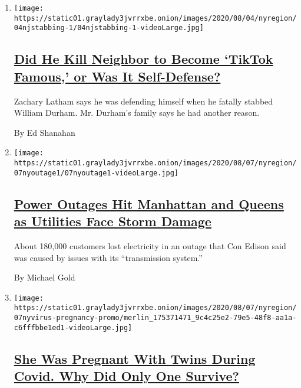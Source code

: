 \begin{enumerate}
\def\labelenumi{\arabic{enumi}.}
\item
  \texttt{[image: https://static01.graylady3jvrrxbe.onion/images/2020/08/04/nyregion/04njstabbing-1/04njstabbing-1-videoLarge.jpg]}

  \hypertarget{did-he-kill-neighbor-to-become-tiktok-famous-or-was-it-self-defense}{%
  \subsection{\texorpdfstring{\href{/2020/08/07/nyregion/tiktok-manslaughter-new-jersey.html}{Did
  He Kill Neighbor to Become `TikTok Famous,' or Was It
  Self-Defense?}}{Did He Kill Neighbor to Become `TikTok Famous,' or Was It Self-Defense?}}\label{did-he-kill-neighbor-to-become-tiktok-famous-or-was-it-self-defense}}

  Zachary Latham says he was defending himself when he fatally stabbed
  William Durham. Mr. Durham's family says he had another reason.

  By Ed Shanahan
\item
  \texttt{[image: https://static01.graylady3jvrrxbe.onion/images/2020/08/07/nyregion/07nyoutage1/07nyoutage1-videoLarge.jpg]}

  \hypertarget{power-outages-hit-manhattan-and-queens-as-utilities-face-storm-damage}{%
  \subsection{\texorpdfstring{\href{/2020/08/07/nyregion/queens-manhattan-west-side-power-outage-coned.html}{Power
  Outages Hit Manhattan and Queens as Utilities Face Storm
  Damage}}{Power Outages Hit Manhattan and Queens as Utilities Face Storm Damage}}\label{power-outages-hit-manhattan-and-queens-as-utilities-face-storm-damage}}

  About 180,000 customers lost electricity in an outage that Con Edison
  said was caused by issues with its ``transmission system.''

  By Michael Gold
\item
  \texttt{[image: https://static01.graylady3jvrrxbe.onion/images/2020/08/07/nyregion/07nyvirus-pregnancy-promo/merlin\_175371471\_9c4c25e2-79e5-48f8-aa1a-c6fffbbe1ed1-videoLarge.jpg]}

  \hypertarget{she-was-pregnant-with-twins-during-covid-why-did-only-one-survive}{%
  \subsection{\texorpdfstring{\href{/2020/08/06/nyregion/childbirth-Covid-Black-mothers.html}{She
  Was Pregnant With Twins During Covid. Why Did Only One
  Survive?}}{She Was Pregnant With Twins During Covid. Why Did Only One Survive?}}\label{she-was-pregnant-with-twins-during-covid-why-did-only-one-survive}}


\end{enumerate}
